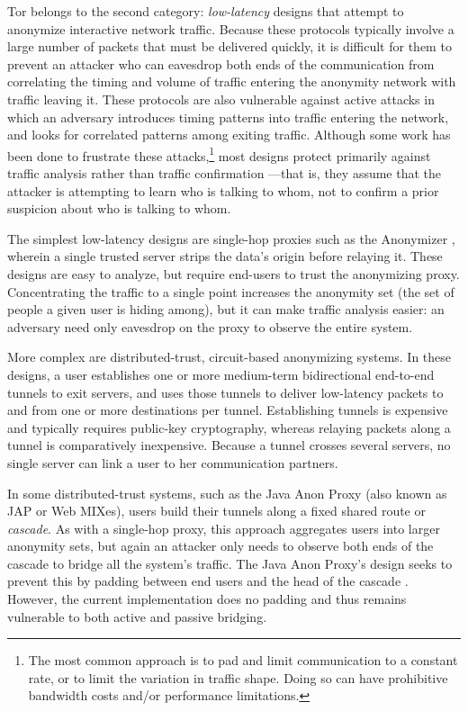 \documentclass[times,10pt,twocolumn]{article}
\begin{document}
Tor belongs to the second category: \emph{low-latency} designs that attempt
to anonymize interactive network traffic.  Because these protocols typically
involve a large number of packets that must be delivered quickly, it is
difficult for them to prevent an attacker who can eavesdrop both ends of the
communication from correlating the timing and volume
of traffic entering the anonymity network with traffic leaving it.  These
protocols are also vulnerable against active attacks in which an
adversary introduces timing patterns into traffic entering the network, and 
looks
for correlated patterns among exiting traffic.
Although some work has been done to frustrate
these attacks,\footnote{
  The most common approach is to pad and limit communication to a constant
  rate, or to limit
  the variation in traffic shape.  Doing so can have prohibitive bandwidth
  costs and/or performance limitations.
} most designs protect primarily against traffic analysis rather than traffic
confirmation \cite{or-jsac98}---that is, they assume that the attacker is
attempting to learn who is talking to whom, not to confirm a prior suspicion
about who is talking to whom.

The simplest low-latency designs are single-hop proxies such as the
Anonymizer \cite{anonymizer}, wherein a single trusted server strips the
data's origin before relaying it.  These designs are easy to
analyze, but require end-users to trust the anonymizing proxy. 
Concentrating the traffic to a single point increases the anonymity set
(the set of people a given user is hiding among), but it can make traffic
analysis easier: an adversary need only eavesdrop on the proxy to observe
the entire system.

More complex are distributed-trust, circuit-based anonymizing systems.  In
these designs, a user establishes one or more medium-term bidirectional
end-to-end tunnels to exit servers, and uses those tunnels to deliver
low-latency packets to and from one or more destinations per
tunnel. %
Establishing tunnels is expensive and typically
requires public-key cryptography, whereas relaying packets along a tunnel is
comparatively inexpensive.  Because a tunnel crosses several servers, no
single server can link a user to her communication partners.

In some distributed-trust systems, such as the Java Anon Proxy (also known
as JAP or Web MIXes), users build their tunnels along a fixed shared route
or \emph{cascade}.  As with a single-hop proxy, this approach aggregates
users into larger anonymity sets, but again an attacker only needs to
observe both ends of the cascade to bridge all the system's traffic.
The Java Anon Proxy's design seeks to prevent this by padding
between end users and the head of the cascade \cite{web-mix}. However, the
current implementation does no padding and thus remains vulnerable
to both active and passive bridging.
\end{document}
